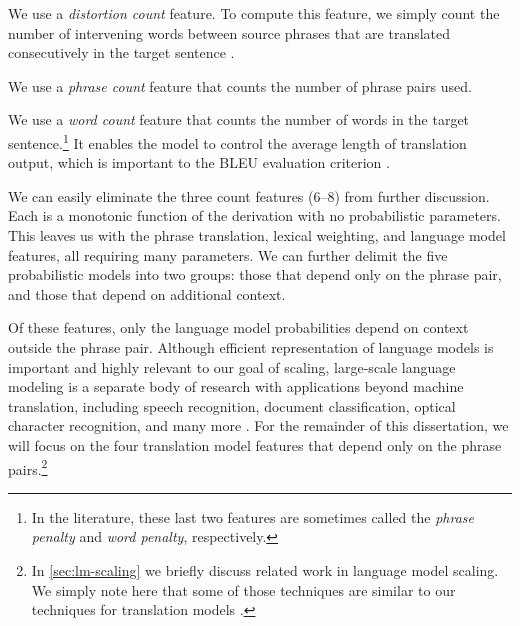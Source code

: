 \begin{asparaenum}
\item We use a {\em distortion count} feature.  To compute this feature,
we simply count the number of intervening words between source phrases 
that are translated consecutively in the target sentence 
\citep{Marcu:2002:emnlp,Koehn:2003:naacl}. 

\item We use a {\em phrase count} feature that counts the number of phrase pairs used.

\item We use a {\em word count} feature that counts the number of words in the
target sentence.\footnote{In the literature, these last two features are 
sometimes called the {\em phrase penalty} and {\em word penalty}, respectively.} 
It enables the model to control the average length of translation output, which is
important to the BLEU evaluation criterion 
\citep[see also \textsection\ref{sec:evaluation}]{Papineni:2002:acl}.
\end{asparaenum}


We can easily eliminate the three count features (6--8) from further discussion.
Each is a monotonic function of the derivation with no
probabilistic parameters.  This leaves us with the phrase translation, lexical weighting, and
language model features, all requiring many parameters.
We can further delimit the five probabilistic models into two groups:
those that depend only on the phrase pair, and those that depend on additional
context.  

Of these features, only the language model probabilities 
depend on context outside the phrase pair. Although efficient 
representation of language models is important and highly relevant
to our goal of scaling, large-scale language modeling is a separate
body of research with applications beyond machine 
translation, including speech recognition, document classification,
optical character recognition, and many more \citep{rosenfeld:2000:ieee}.
For the remainder of this dissertation, we will focus on the four 
translation model features that depend only on the phrase pairs.\footnote{In \textsection\ref{sec:lm-scaling} we briefly discuss 
related work in language model scaling.  We simply note here that
some of those techniques are similar to our techniques for
translation models \citep[e.g.][]{Zhang:2006:emnlp}.}

